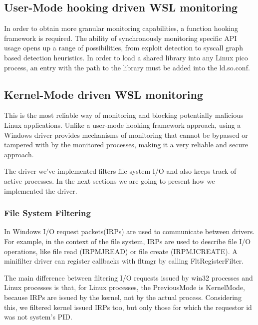 \documentclass[conference]{IEEEtran}
\begin{document}
\subsection{User-Mode hooking driven WSL monitoring}
    
    In order to obtain more granular monitoring capabilities, a function hooking framework is required. The ability of synchronously monitoring
    specific API usage opens up a range of possibilities, from exploit detection to syscall graph based detection heuristics.
    In order to load a shared library into any Linux pico process, an entry with the path to the library must be added into the ld.so.conf.\\

\subsection{Kernel-Mode driven WSL monitoring}
    
    This is the most reliable way of monitoring and blocking potentially malicious Linux applications. Unlike a user-mode hooking framework
    approach, using a Windows driver provides mechanisms of monitoring that cannot be bypassed or tampered with by the monitored processes, making
    it a very reliable and secure approach.\\

    \par{}
    The driver we've implemented filters file system I/O and also keeps track of active processes. In the next sections we are going to present
    how we implemented the driver.\\
    
    \subsubsection{File System Filtering}
    In Windows I/O request packets(IRPs) are used to communicate between drivers. For example, in the context of the file system, IRPs are used
    to describe file I/O operations, like file read (IRP\textunderscore MJ\textunderscore READ) or file create
    (IRP\textunderscore MJ\textunderscore CREATE). A minifilter driver can register callbacks with fltmgr by calling FltRegisterFilter.\\
    

    \par{}
    The main difference between filtering I/O requests issued by win32 processes and Linux processes is that, for Linux processes,
    the PreviousMode is KernelMode, because IRPs are issued by the kernel, not by the actual process. Considering this, we filtered kernel
    issued IRPs too, but only those for which the requestor id was not system's PID.\\
\end{document}

